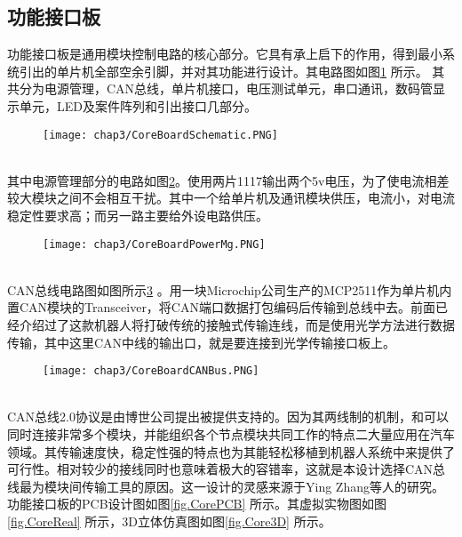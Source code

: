 \subsection{功能接口板}
功能接口板是通用模块控制电路的核心部分。它具有承上启下的作用，得到最小系统引出的单片机全部空余引脚，并对其功能进行设计。其电路图如图\ref{fig.BaseSch} 所示。 其共分为电源管理，CAN总线，单片机接口，电压测试单元，串口通讯，数码管显示单元，LED及案件阵列和引出接口几部分。 \\
\begin{figure}[!htp]\label{fig.BaseSch}
  \centering
  \texttt{[image: chap3/CoreBoardSchematic.PNG]}
\end{figure}
\\
其中电源管理部分的电路如图\ref{fig.BaseScrMg}。使用两片1117输出两个5v电压，为了使电流相差较大模块之间不会相互干扰。其中一个给单片机及通讯模块供压，电流小，对电流稳定性要求高；而另一路主要给外设电路供压。 \\
\begin{figure}[!htp]\label{fig.BaseScrMg}
  \centering
  \texttt{[image: chap3/CoreBoardPowerMg.PNG]}
\end{figure}
\\
CAN总线电路图如图所示\ref{fig.BaseCAN} 。用一块Microchip公司生产的MCP2511作为单片机内置CAN模块的Transceiver，将CAN端口数据打包编码后传输到总线中去。前面已经介绍过了这款机器人将打破传统的接触式传输连线，而是使用光学方法进行数据传输，其中这里CAN中线的输出口，就是要连接到光学传输接口板上。\\
\begin{figure}[!htp]\label{fig.BaseCAN}
  \centering
  \texttt{[image: chap3/CoreBoardCANBus.PNG]}
\end{figure}
\\
CAN总线2.0协议是由博世公司提出被提供支持的。因为其两线制的机制，和可以同时连接非常多个模块，并能组织各个节点模块共同工作的特点二大量应用在汽车领域。其传输速度快，稳定性强的特点也为其能轻松移植到机器人系统中来提供了可行性。相对较少的接线同时也意味着极大的容错率，这就是本设计选择CAN总线最为模块间传输工具的原因。这一设计的灵感来源于Ying Zhang等人的研究。\\
功能接口板的PCB设计图如图\ref{fig.CorePCB} 所示。其虚拟实物图如图\ref{fig.CoreReal} 所示，3D立体仿真图如图\ref{fig.Core3D} 所示。 \\
